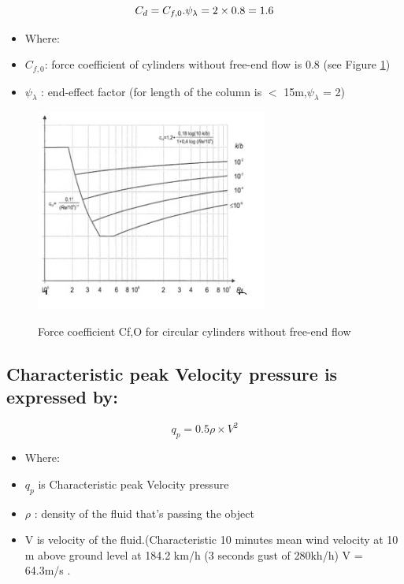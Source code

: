 {\begin{equation}
C_d = C_{f,0} . \psi_\lambda \label{eq:3.4} \\
= 2 \times0.8 = 1.6 
\end{equation}

\begin{itemize}[label={}]
\item Where:
 \item \(C_{f,0}\): force coefficient of cylinders without free-end flow is 0.8 (see Figure \ref{fig:3.4}) 
\item \(\psi_\lambda\) : end-effect factor (for length of the column is $<$ 15m,\(\psi_\lambda\) = 2)
\end{itemize}
   

\begin{figure}[htp]
    \centering
    \includegraphics[width=3in]{Figures/CF2.jpg}
    \caption{Force coefficient Cf,O for circular cylinders without free-end flow}
    \cite{en19911}
    \label{fig:3.4}
\end{figure}



\subsection{Characteristic peak Velocity pressure is expressed by:}

\begin{equation}
q_p = 0.5 \rho \times V^2
\end{equation}

\begin{itemize}[label={}]
\item Where:
\item \(q_p\) is Characteristic peak Velocity pressure
\item  \(\rho \) : density of the fluid that’s passing the object
\item V is velocity of the fluid.(Characteristic 10 minutes mean wind velocity at 10 m above ground level at 184.2 km/h (3 seconds gust of 280kh/h) V = 64.3m/s \cite{cho2003wind,mms_2020}.
\end{itemize}

}
